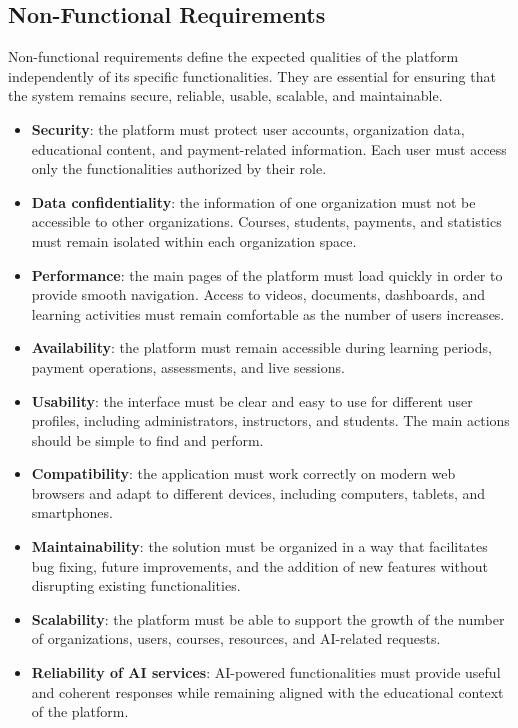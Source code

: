 \subsection{Non-Functional Requirements}

Non-functional requirements define the expected qualities of the platform independently of
its specific functionalities. They are essential for ensuring that the system remains
secure, reliable, usable, scalable, and maintainable.

\begin{itemize}

  \item \textbf{Security}: the platform must protect user accounts, organization data,
        educational content, and payment-related information. Each user must access only
        the functionalities authorized by their role.

  \item \textbf{Data confidentiality}: the information of one organization must not be
        accessible to other organizations. Courses, students, payments, and statistics must
        remain isolated within each organization space.

  \item \textbf{Performance}: the main pages of the platform must load quickly in order to
        provide smooth navigation. Access to videos, documents, dashboards, and learning
        activities must remain comfortable as the number of users increases.

  \item \textbf{Availability}: the platform must remain accessible during learning periods,
        payment operations, assessments, and live sessions.

  \item \textbf{Usability}: the interface must be clear and easy to use for different user
        profiles, including administrators, instructors, and students. The main actions
        should be simple to find and perform.

  \item \textbf{Compatibility}: the application must work correctly on modern web browsers
        and adapt to different devices, including computers, tablets, and smartphones.

  \item \textbf{Maintainability}: the solution must be organized in a way that facilitates
        bug fixing, future improvements, and the addition of new features without disrupting
        existing functionalities.

  \item \textbf{Scalability}: the platform must be able to support the growth of the number
        of organizations, users, courses, resources, and AI-related requests.

  \item \textbf{Reliability of AI services}: AI-powered functionalities must provide useful
        and coherent responses while remaining aligned with the educational context of the
        platform.

\end{itemize}

